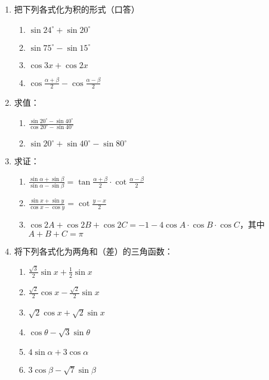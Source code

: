 \begin{ex}
\begin{enumerate}
    \item 把下列各式化为积的形式（口答）
\begin{multicols}{2}
\begin{enumerate}
    \item $\sin 24^{\circ}+\sin 20^{\circ}$
    \item $\sin 75^{\circ}-\sin 15^{\circ}$
    \item $\cos 3x+\cos 2x$
    \item $\cos\frac{\alpha+\beta}{2}-\cos\frac{\alpha-\beta}{2}$
\end{enumerate}
\end{multicols}

\item 求值：
\begin{enumerate}
    \item $\frac{\sin20^{\circ}-\sin 40^{\circ}}{\cos 20^{\circ}-\sin 40^{\circ}}$
    \item $\sin 20^{\circ}+\sin 40^{\circ}-\sin 80^{\circ}$
\end{enumerate}

\item 求证：
\begin{enumerate}
    \item $\frac{\sin\alpha+\sin\beta}{\sin\alpha-\sin\beta}=\tan\frac{\alpha+\beta}{2}\cdot \cot\frac{\alpha-\beta}{2}$
    \item $\frac{\sin x+\sin y}{\cos x-\cos y}=\cot\frac{y-x}{2}$
    \item $\cos 2A+\cos 2B+\cos 2C=-1-4\cos A\cdot \cos B\cdot \cos C$，其中$A+B+C=\pi$
\end{enumerate}

\item 将下列各式化为两角和（差）的三角函数：
\begin{multicols}{2}
\begin{enumerate}
    \item $\frac{\sqrt{3}}{2}\sin x+\frac{1}{2}\sin x$
    \item $\frac{\sqrt{2}}{2}\cos x-\frac{\sqrt{2}}{2}\sin x$
    \item $\sqrt{2}\cos x+\sqrt{2}\sin x$
    \item $\cos\theta-\sqrt{3}\sin\theta$
    \item $4\sin\alpha+3\cos\alpha$
    \item $3\cos\beta-\sqrt{7}\sin\beta$
\end{enumerate}
\end{multicols}
\end{enumerate}
\end{ex}

